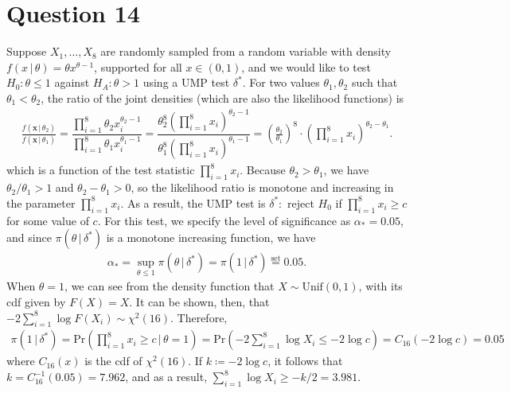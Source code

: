 \documentclass[10pt]{article}
\begin{document}
\section{Question 14} \noindent
Suppose \(X_1, \ldots, X_8\) are randomly sampled from a random variable with density \(f(x \,|\, \theta) = \theta x^{\theta - 1}\), supported for all 
\(x \in (0,1)\), and we would like to test \(H_0 : \theta \le 1\) against \(H_A : \theta > 1\) using a UMP test \(\delta^*\).
For two values \(\theta_1,\theta_2\) such that \(\theta_1 < \theta_2\), the ratio of the joint densities (which are also the likelihood
functions) is 
\begin{align*}
    \frac{f(\mathbf{x} \,|\, \theta_2)}{f(\mathbf{x} \,|\, \theta_1)}
    = \dfrac{\prod_{i=1}^8 \theta_2 x_i^{\theta_2 - 1}}{\prod_{i=1}^8 \theta_1 x_i^{\theta_1 - 1}}
    = \dfrac{\theta_2^8 \left( \prod_{i=1}^8 x_i \right)^{\theta_2-1}}{\theta_1^8 \left( \prod_{i=1}^8 x_i \right)^{\theta_1-1}}
    = \left( \frac{\theta_2}{\theta_1} \right)^{8} \cdot \left( \prod_{i=1}^8 x_i \right)^{\theta_2 - \theta_1}.
\end{align*}
which is a function of the test statistic \(\prod_{i=1}^8 x_i\). Because \(\theta_2 > \theta_1\), we have \(\theta_2 / \theta_1 > 1\) and \(\theta_2 - \theta_1 > 0\), 
so the likelihood ratio is monotone and increasing in the parameter \(\prod_{i=1}^8 x_i\). As a result, the UMP test is \(\delta^* :\) reject 
\(H_0\) if \(\prod_{i=1}^8 x_i \ge c\) for some value of \(c\). For this test, we specify the level of significance as \(\alpha_* = 0.05\), and 
since \(\pi(\theta \,|\, \delta^*)\) is a monotone increasing function, we have 
\begin{align*}
    \alpha_* 
    = \sup_{\theta \le 1} \pi(\theta \,|\, \delta^*)
    = \pi(1 \,|\, \delta^*)
    \overset{\mathrm{set}}{=} 0.05.
\end{align*}
When \(\theta = 1\), we can see from the density function that \(X \sim \mathrm{Unif}(0,1)\), with its cdf given by \(F(X) = X\). 
It can be shown, then, that \(-2 \sum_{i=1}^8 \log F(X_i) \sim \chi^2(16)\). Therefore, 
\begin{align*}
    \pi(1 \,|\, \delta^*)
    = \mathrm{Pr}\left( \prod_{i=1}^8 x_i \ge c \,|\, \theta = 1 \right)
    = \mathrm{Pr} \left( -2 \sum_{i=1}^8 \log X_i \le -2 \log c \right)
    = C_{16}(-2 \log c)
    = 0.05
\end{align*}
where \(C_{16}(x)\) is the cdf of \(\chi^2(16)\). If \(k \coloneqq -2 \log c\), it follows that \(k = C_{16}^{-1}(0.05) = 7.962\), 
and as a result, \(\sum_{i=1}^8 \log X_i \ge - k / 2 = 3.981\).
\end{document}
